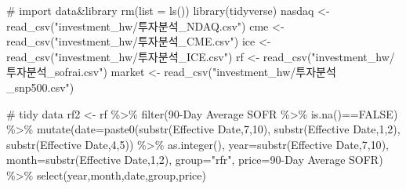 \documentclass[
  letterpaper,
  DIV=11,
  numbers=noendperiod]{scrreprt}
\newenvironment{Shaded}{\begin{snugshade}}{\end{snugshade}}
\newcommand{\AttributeTok}[1]{\textcolor[rgb]{0.40,0.45,0.13}{#1}}
\newcommand{\CommentTok}[1]{\textcolor[rgb]{0.37,0.37,0.37}{#1}}
\newcommand{\ConstantTok}[1]{\textcolor[rgb]{0.56,0.35,0.01}{#1}}
\newcommand{\DecValTok}[1]{\textcolor[rgb]{0.68,0.00,0.00}{#1}}
\newcommand{\FunctionTok}[1]{\textcolor[rgb]{0.28,0.35,0.67}{#1}}
\newcommand{\NormalTok}[1]{\textcolor[rgb]{0.00,0.23,0.31}{#1}}
\newcommand{\OtherTok}[1]{\textcolor[rgb]{0.00,0.23,0.31}{#1}}
\newcommand{\SpecialCharTok}[1]{\textcolor[rgb]{0.37,0.37,0.37}{#1}}
\newcommand{\StringTok}[1]{\textcolor[rgb]{0.13,0.47,0.30}{#1}}
\begin{document}
\begin{Shaded}
\begin{Highlighting}[]
\CommentTok{\# import data\&library}
\FunctionTok{rm}\NormalTok{(}\AttributeTok{list =} \FunctionTok{ls}\NormalTok{())}
\FunctionTok{library}\NormalTok{(tidyverse)}
\NormalTok{nasdaq }\OtherTok{\textless{}{-}} \FunctionTok{read\_csv}\NormalTok{(}\StringTok{"investment\_hw/투자분석\_NDAQ.csv"}\NormalTok{)}
\NormalTok{cme }\OtherTok{\textless{}{-}} \FunctionTok{read\_csv}\NormalTok{(}\StringTok{"investment\_hw/투자분석\_CME.csv"}\NormalTok{)}
\NormalTok{ice }\OtherTok{\textless{}{-}} \FunctionTok{read\_csv}\NormalTok{(}\StringTok{"investment\_hw/투자분석\_ICE.csv"}\NormalTok{)}
\NormalTok{rf }\OtherTok{\textless{}{-}} \FunctionTok{read\_csv}\NormalTok{(}\StringTok{"investment\_hw/투자분석\_sofrai.csv"}\NormalTok{)}
\NormalTok{market }\OtherTok{\textless{}{-}} \FunctionTok{read\_csv}\NormalTok{(}\StringTok{"investment\_hw/투자분석\_snp500.csv"}\NormalTok{)}

\CommentTok{\# tidy data}
\NormalTok{rf2 }\OtherTok{\textless{}{-}}\NormalTok{ rf }\SpecialCharTok{\%\textgreater{}\%} 
  \FunctionTok{filter}\NormalTok{(}\StringTok{\textasciigrave{}}\AttributeTok{90{-}Day Average SOFR}\StringTok{\textasciigrave{}} \SpecialCharTok{\%\textgreater{}\%} \FunctionTok{is.na}\NormalTok{()}\SpecialCharTok{==}\ConstantTok{FALSE}\NormalTok{) }\SpecialCharTok{\%\textgreater{}\%} 
  \FunctionTok{mutate}\NormalTok{(}\AttributeTok{date=}\FunctionTok{paste0}\NormalTok{(}\FunctionTok{substr}\NormalTok{(}\StringTok{\textasciigrave{}}\AttributeTok{Effective Date}\StringTok{\textasciigrave{}}\NormalTok{,}\DecValTok{7}\NormalTok{,}\DecValTok{10}\NormalTok{),}
                     \FunctionTok{substr}\NormalTok{(}\StringTok{\textasciigrave{}}\AttributeTok{Effective Date}\StringTok{\textasciigrave{}}\NormalTok{,}\DecValTok{1}\NormalTok{,}\DecValTok{2}\NormalTok{),}
                     \FunctionTok{substr}\NormalTok{(}\StringTok{\textasciigrave{}}\AttributeTok{Effective Date}\StringTok{\textasciigrave{}}\NormalTok{,}\DecValTok{4}\NormalTok{,}\DecValTok{5}\NormalTok{)) }\SpecialCharTok{\%\textgreater{}\%} \FunctionTok{as.integer}\NormalTok{(),}
         \AttributeTok{year=}\FunctionTok{substr}\NormalTok{(}\StringTok{\textasciigrave{}}\AttributeTok{Effective Date}\StringTok{\textasciigrave{}}\NormalTok{,}\DecValTok{7}\NormalTok{,}\DecValTok{10}\NormalTok{),}
         \AttributeTok{month=}\FunctionTok{substr}\NormalTok{(}\StringTok{\textasciigrave{}}\AttributeTok{Effective Date}\StringTok{\textasciigrave{}}\NormalTok{,}\DecValTok{1}\NormalTok{,}\DecValTok{2}\NormalTok{),}
         \AttributeTok{group=}\StringTok{"rfr"}\NormalTok{,}
         \AttributeTok{price=}\StringTok{\textasciigrave{}}\AttributeTok{90{-}Day Average SOFR}\StringTok{\textasciigrave{}}\NormalTok{) }\SpecialCharTok{\%\textgreater{}\%} 
  \FunctionTok{select}\NormalTok{(year,month,date,group,price)}


\end{Highlighting}
\end{Shaded}
\end{document}
